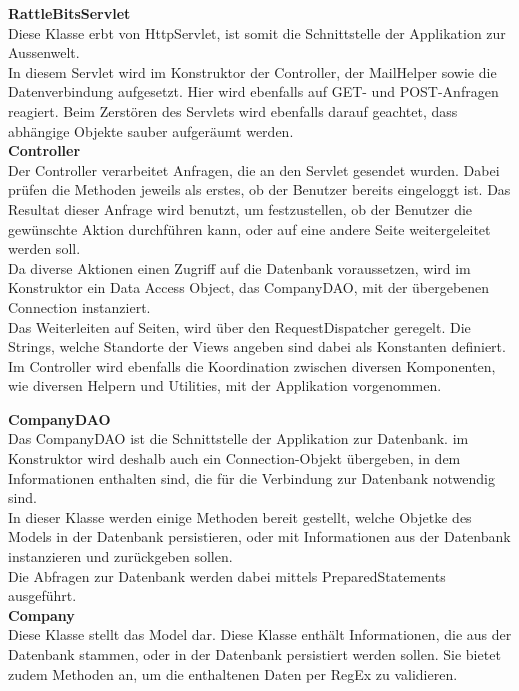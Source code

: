 \documentclass[12pt]{scrartcl}
\begin{document}
\textbf{RattleBitsServlet}\\
Diese Klasse erbt von HttpServlet, ist somit die Schnittstelle der Applikation zur Aussenwelt.\\
In diesem Servlet wird im Konstruktor der Controller, der MailHelper sowie die Datenverbindung aufgesetzt. Hier wird ebenfalls auf GET- und POST-Anfragen reagiert. Beim Zerstören des Servlets wird ebenfalls darauf geachtet, dass abhängige Objekte sauber aufgeräumt werden.\\

\textbf{Controller}\\
Der Controller verarbeitet Anfragen, die an den Servlet gesendet wurden. Dabei prüfen die Methoden jeweils als erstes, ob der Benutzer bereits eingeloggt ist. Das Resultat dieser Anfrage wird benutzt, um festzustellen, ob der Benutzer die gewünschte Aktion durchführen kann, oder auf eine andere Seite weitergeleitet werden soll.\\
Da diverse Aktionen einen Zugriff auf die Datenbank voraussetzen, wird im Konstruktor ein Data Access Object, das CompanyDAO, mit der übergebenen Connection instanziert.\\
Das Weiterleiten auf Seiten, wird über den RequestDispatcher geregelt. Die Strings, welche Standorte der Views angeben sind dabei als Konstanten definiert.\\
Im Controller wird ebenfalls die Koordination zwischen diversen Komponenten, wie diversen Helpern und Utilities, mit der Applikation vorgenommen.

\textbf{CompanyDAO}\\
Das CompanyDAO ist die Schnittstelle der Applikation zur Datenbank. im Konstruktor wird deshalb auch ein Connection-Objekt übergeben, in dem Informationen enthalten sind, die für die Verbindung zur Datenbank notwendig sind.\\
In dieser Klasse werden einige Methoden bereit gestellt, welche Objetke des Models in der Datenbank persistieren, oder mit Informationen aus der Datenbank instanzieren und zurückgeben sollen.\\
Die Abfragen zur Datenbank werden dabei mittels PreparedStatements ausgeführt.\\

\textbf{Company}\\
Diese Klasse stellt das Model dar. Diese Klasse enthält Informationen, die aus der Datenbank stammen, oder in der Datenbank persistiert werden sollen. Sie bietet zudem Methoden an, um die enthaltenen Daten per RegEx zu validieren.\\
\end{document}
